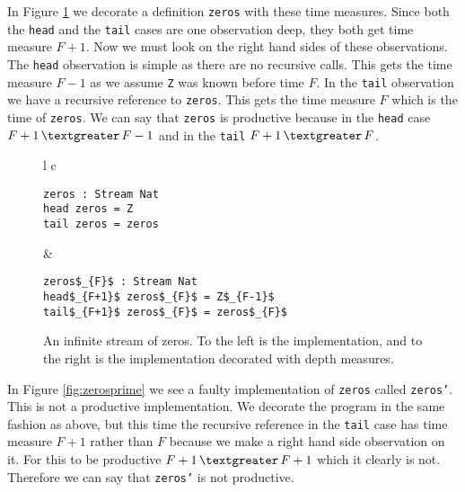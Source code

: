 In Figure \ref{fig:zeros} we decorate a definition \texttt{zeros} with these time measures. Since both the \texttt{head} and the \texttt{tail} cases are one observation deep, they both get time measure $F+1$. Now we must look on the right hand sides of these observations. The \texttt{head} observation is simple as there are no recursive calls. This gets the time measure $F-1$ as we assume \texttt{Z} was known before time $F$. In the \texttt{tail} observation we have a recursive reference to \texttt{zeros}. This gets the time measure $F$ which is the time of \texttt{zeros}. We can say that \texttt{zeros} is productive because in the \texttt{head} case $F+1\,\textgreater\,F-1$ and in the \texttt{tail} $F+1\,\textgreater\,F$.

\begin{figure}
\begin{tabular}{l c}
\begin{minipage}{3in}
\begin{Verbatim}[commandchars=\\\{\},codes={\catcode`$=3\catcode`_=8}]
zeros : Stream Nat
head zeros = Z
tail zeros = zeros
\end{Verbatim}
\end{minipage} &
\begin{minipage}{3in}
\begin{Verbatim}[commandchars=\\\{\},codes={\catcode`$=3\catcode`_=8}]
zeros$_{F}$ : Stream Nat
head$_{F+1}$ zeros$_{F}$ = Z$_{F-1}$
tail$_{F+1}$ zeros$_{F}$ = zeros$_{F}$
\end{Verbatim}
\end{minipage}
\end{tabular}
\caption{An infinite stream of zeros. To the left is the implementation, and to the right is the implementation decorated with depth measures.}
\label{fig:zeros}
\end{figure}

In Figure \ref{fig:zerosprime} we see a faulty implementation of \texttt{zeros} called \texttt{zeros'}. This is not a productive implementation. We decorate the program in the same fashion as above, but this time the recursive reference in the \texttt{tail} case has time measure $F+1$ rather than $F$ because we make a right hand side observation on it. For this to be productive $F+1\,\textgreater\,F+1$ which it clearly is not. Therefore we can say that \texttt{zeros'} is not productive.

